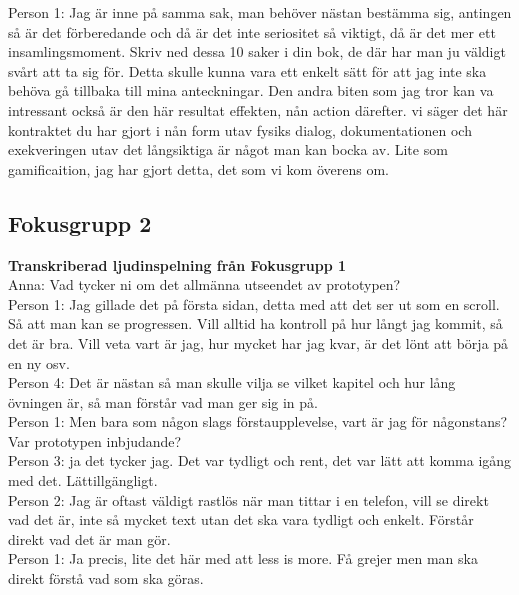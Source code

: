 Person 1: Jag är inne på samma sak, man behöver nästan bestämma sig, antingen så är det förberedande och då är det inte seriositet så viktigt, då är det mer ett insamlingsmoment. Skriv ned dessa 10 saker i din bok, de där har man ju väldigt svårt att ta sig för. Detta skulle kunna vara ett enkelt sätt för att jag inte ska behöva gå tillbaka till mina anteckningar. Den andra biten som jag tror kan va intressant också är den här resultat effekten, nån action därefter. vi säger det här kontraktet du har gjort i nån form utav fysiks dialog, dokumentationen och exekveringen utav det långsiktiga är något man kan bocka av. Lite som gamificaition, jag har gjort detta, det som vi kom överens om. \\

\subsection{Fokusgrupp 2}

\textbf{Transkriberad ljudinspelning från Fokusgrupp 1}
\\

Anna: Vad tycker ni om det allmänna utseendet av prototypen? \\

Person 1: Jag gillade det på första sidan, detta med att det ser ut som en scroll. Så att man kan se progressen. Vill alltid ha kontroll på hur långt jag kommit, så det är bra. Vill veta vart är jag, hur mycket har jag kvar, är det lönt att börja på en ny osv. \\

Person 4: Det är nästan så man skulle vilja se vilket kapitel och hur lång övningen är, så man förstår vad man ger sig in på. \\

Person 1: Men bara som någon slags förstaupplevelse, vart är jag för någonstans? \\

Var prototypen inbjudande?\\

Person 3: ja det tycker jag. Det var tydligt och rent, det var lätt att komma igång med det. Lättillgängligt. \\

Person 2: Jag är oftast väldigt rastlös när man tittar i en telefon, vill se direkt vad det är, inte så mycket text utan det ska vara tydligt och enkelt. Förstår direkt vad det är man gör. \\

Person 1: Ja precis, lite det här med att less is more. Få grejer men man ska direkt förstå vad som ska göras. \\


